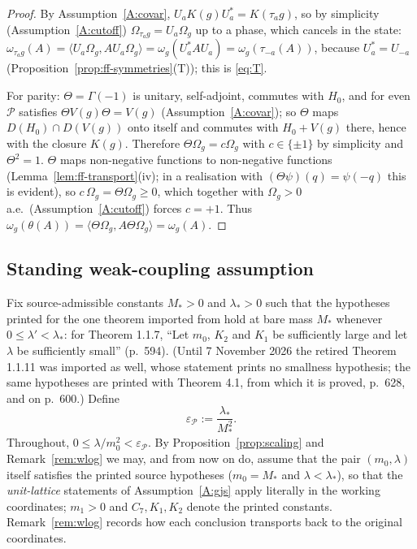 \documentclass[11pt,a4paper]{article}
\theoremstyle{plain}
\theoremstyle{definition}
\theoremstyle{plain}
\theoremstyle{definition}
\newcommand{\Om}{\Omega}
\newcommand{\ip}[2]{\langle #1,#2\rangle}
\begin{document}
\begin{proof}
By Assumption~\ref{A:covar}, $U_aK(g)U_a^*=K(\tau_ag)$, so by simplicity
(Assumption~\ref{A:cutoff}) $\Om_{\tau_ag}=U_a\Om_g$ up to a phase, which cancels in the
state: $\omega_{\tau_ag}(A)=\ip{U_a\Om_g}{AU_a\Om_g}=\omega_g(U_a^*AU_a)=\omega_g(\tau_{-a}(A))$,
because $U_a^*=U_{-a}$ (Proposition~\ref{prop:ff-symmetries}(T)); this is \eqref{eq:T}.

For parity: $\Theta=\Gamma(-1)$ is unitary, self-adjoint, commutes with $H_0$, and for even
$\mathscr P$ satisfies $\Theta V(g)\Theta=V(g)$ (Assumption~\ref{A:covar}); so $\Theta$ maps
$D(H_0)\cap D(V(g))$ onto itself and commutes with $H_0+V(g)$ there, hence with the closure
$K(g)$.  Therefore
$\Theta\Om_g=c\Om_g$ with $c\in\{\pm1\}$ by simplicity and $\Theta^2=1$.  $\Theta$ maps
non-negative functions to non-negative functions (Lemma~\ref{lem:ff-transport}(iv); in a
realisation with $(\Theta\psi)(q)=\psi(-q)$ this is evident), so $c\,\Om_g=\Theta\Om_g\ge0$,
which together with $\Om_g>0$ a.e.\ (Assumption~\ref{A:cutoff}) forces $c=+1$. Thus
$\omega_g(\theta(A))=\ip{\Theta\Om_g}{A\Theta\Om_g}=\omega_g(A)$.
\end{proof}

\subsection{Standing weak-coupling assumption}\label{subsec:weak}

Fix source-admissible constants $M_*>0$ and $\lambda_*>0$ such that the hypotheses printed
for the one theorem imported from \cite{GJS} hold at bare mass $M_*$ whenever
$0\le\lambda'<\lambda_*$: for Theorem 1.1.7, ``Let $m_0$, $K_2$ and $K_1$ be sufficiently
large and let $\lambda$ be sufficiently small'' (p.~594).  (Until 7 November 2026 the
retired Theorem 1.1.11 was imported as well, whose statement prints no smallness
hypothesis; the same hypotheses are printed with Theorem 4.1, from which it is proved,
p.~628, and on p.~600.) Define
\[
  \varepsilon_{\mathscr P}:=\frac{\lambda_*}{M_*^2} .
\]
Throughout, $0\le\lambda/m_0^2<\varepsilon_{\mathscr P}$. By
Proposition~\ref{prop:scaling} and Remark~\ref{rem:wlog} we may, and from now on do,
assume that the pair $(m_0,\lambda)$ itself satisfies the printed source hypotheses
($m_0=M_*$ and $\lambda<\lambda_*$), so that the \emph{unit-lattice} statements of
Assumption~\ref{A:gjs} apply literally in the working coordinates; $m_1>0$ and
$C_7,K_1,K_2$ denote the printed constants. Remark~\ref{rem:wlog} records how each
conclusion transports back to the original coordinates.
\end{document}
